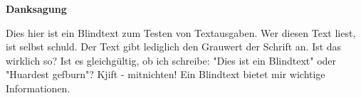 %
\vspace*{\fill}
\begin{center}\textsf{\textbf{Danksagung}}\end{center}

\noindent Dies hier ist ein Blindtext zum Testen von Textausgaben. Wer diesen Text liest, 
ist selbst schuld. Der Text gibt lediglich den Grauwert der Schrift an. 
Ist das wirklich so? Ist es gleichgültig, ob ich schreibe: "Dies ist ein Blindtext" 
oder "Huardest gefburn"? Kjift - mitnichten! Ein Blindtext bietet mir wichtige Informationen.

\vspace*{\fill}